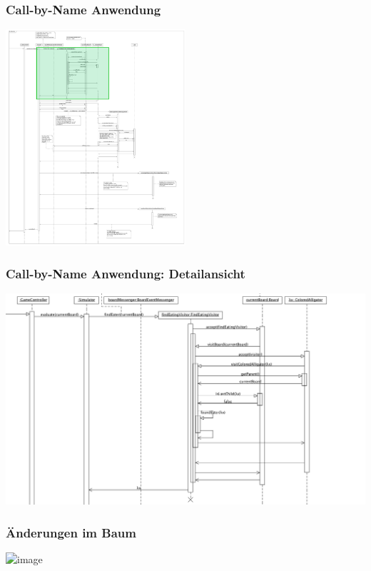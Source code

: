 \documentclass[t]{beamer}
\begin{document}
\begin{frame}
	\frametitle{Call-by-Name Anwendung}
	\begin{center}
	\includegraphics[width=0.5\textwidth]{Beta-Reduktion-withGreen.png}
	\end{center}
\end{frame}

\begin{frame}
	\frametitle{Call-by-Name Anwendung: Detailansicht}
	\includegraphics[width=\textwidth]{FindLocation.png}
\end{frame}



\begin{frame}
	\frametitle{Änderungen im Baum}
	\begin{center}
		\includegraphics<1>[width=0.5\textwidth]{Beta-Reduktion-withBlue.png}
	\end{center}
\end{frame}
\end{document}
